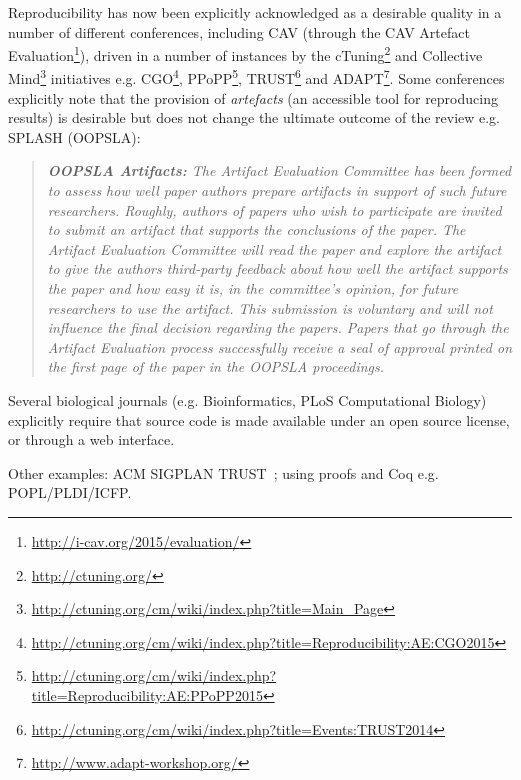 \documentclass{llncs}
\begin{document}
Reproducibility has now been explicitly acknowledged as a desirable
quality in a number of different conferences, including CAV (through
the CAV Artefact
Evaluation\footnote{\url{http://i-cav.org/2015/evaluation/}}), driven
in a number of instances by the
cTuning\footnote{\url{http://ctuning.org/}} and Collective
Mind\footnote{\url{http://ctuning.org/cm/wiki/index.php?title=Main_Page}}
initiatives
e.g. CGO\footnote{\url{http://ctuning.org/cm/wiki/index.php?title=Reproducibility:AE:CGO2015}},
PPoPP\footnote{\url{http://ctuning.org/cm/wiki/index.php?title=Reproducibility:AE:PPoPP2015}},
TRUST\footnote{\url{http://ctuning.org/cm/wiki/index.php?title=Events:TRUST2014}} 
and ADAPT\footnote{\url{http://www.adapt-workshop.org/}}. Some
conferences explicitly note that the provision of \emph{artefacts} (an
accessible tool for reproducing results) is desirable but does not
change the ultimate outcome of the review e.g. SPLASH (OOPSLA): 

\begin{quotation}
{\emph{{\textbf{OOPSLA Artifacts:}} The Artifact Evaluation Committee has been formed
to assess how well paper authors prepare artifacts in support of such
future researchers. Roughly, authors of papers who wish to participate
are invited to submit an artifact that supports the conclusions of the
paper. The Artifact Evaluation Committee will read the paper and
explore the artifact to give the authors third-party feedback about
how well the artifact supports the paper and how easy it is, in the
committee’s opinion, for future researchers to use the artifact. This
submission is voluntary and will not influence the final decision
regarding the papers. Papers that go through the Artifact Evaluation
process successfully receive a seal of approval printed on the first
page of the paper in the OOPSLA proceedings.}}
\end{quotation}

Several biological journals (e.g. Bioinformatics, PLoS Computational
Biology) explicitly require that source code is made available under
an open source license, or through a web interface.



Other examples: ACM SIGPLAN TRUST~\cite{fursin+dubach:2014}; using proofs and
Coq e.g. POPL/PLDI/ICFP.
\end{document}
